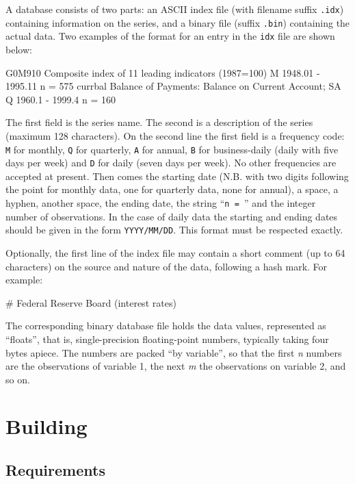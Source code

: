 A  database consists of two parts: an ASCII index file
(with filename suffix \verb+.idx+) containing information on the
series, and a binary file (suffix \verb+.bin+) containing the actual
data.  Two examples of the format for an entry in the \verb+idx+ file
are shown below:

\begin{code}
G0M910  Composite index of 11 leading indicators (1987=100) 
M 1948.01 - 1995.11  n = 575
currbal Balance of Payments: Balance on Current Account; SA 
Q 1960.1 - 1999.4 n = 160
\end{code}

The first field is the series name.  The second is a description of
the series (maximum 128 characters).  On the second line the first
field is a frequency code: \verb+M+ for monthly, \verb+Q+ for
quarterly, \verb+A+ for annual, \verb+B+ for business-daily (daily
with five days per week) and \verb+D+ for daily (seven days per week).
No other frequencies are accepted at present.  Then comes the starting
date (N.B. with two digits following the point for monthly data, one
for quarterly data, none for annual), a space, a hyphen, another
space, the ending date, the string ``\verb+n = +'' and the integer
number of observations. In the case of daily data the starting and
ending dates should be given in the form \verb+YYYY/MM/DD+. This
format must be respected exactly.

Optionally, the first line of the index file may contain a short
comment (up to 64 characters) on the source and nature of the data,
following a hash mark.  For example:

\begin{code}
# Federal Reserve Board (interest rates)
\end{code}

The corresponding binary database file holds the data values,
represented as ``floats'', that is, single-precision floating-point
numbers, typically taking four bytes apiece.  The numbers are packed
``by variable'', so that the first \emph{n} numbers are the
observations of variable 1, the next \emph{m} the observations on
variable 2, and so on.



\chapter{Building }
\label{app-build}

\section{Requirements}
\label{sec:build-req}

